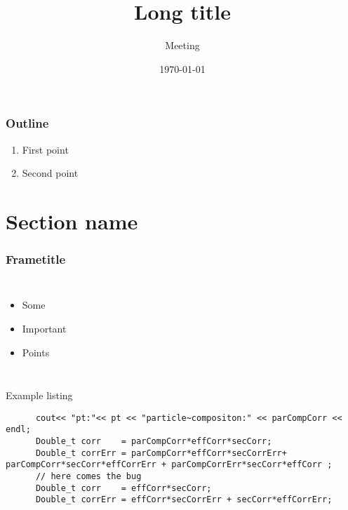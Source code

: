 
\title[Short title]{Long title}
\subtitle[ | Meeting]{Meeting}
\date{\today}

{
\begin{frame}[t,plain]
\titlepage

\end{frame}
}


\begin{frame}
\frametitle{Outline}
\begin{enumerate}
	\item First point
	\item Second point
\end{enumerate}
\end{frame}

\section{Section name}
\begin{frame}
\frametitle{Frametitle}

\begin{columns}[t]
	\begin{itemize}
		\item Some 
		\item Important
		\item Points
	\end{itemize}
\end{columns}
\end{frame}	

\begin{frame}[fragile]{Example listing}


	\begin{lstlisting}
	  cout<< "pt:"<< pt << "particle~compositon:" << parCompCorr << endl;	  
	  Double_t corr    = parCompCorr*effCorr*secCorr;	  
	  Double_t corrErr = parCompCorr*effCorr*secCorrErr+ parCompCorr*secCorr*effCorrErr + parCompCorrErr*secCorr*effCorr ; 	  
	  // here comes the bug	  
	  Double_t corr    = effCorr*secCorr;	  
	  Double_t corrErr = effCorr*secCorrErr + secCorr*effCorrErr;  
	\end{lstlisting} 

\end{frame}	



